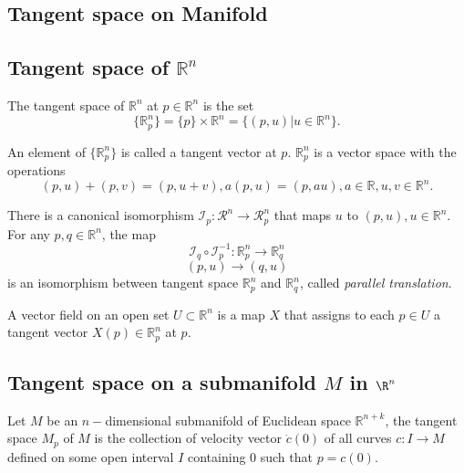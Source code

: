 \begin{refsection}
\section{Tangent space on Manifold}
\subsection{Tangent space of $\mathbb{R}^n$}
\begin{definition}
The tangent space of $\mathbb{R}^n$ at $p\in \mathbb{R}^n$ is the set
$$\{\mathbb{R}_p^n\}=\{p\}\times \mathbb{R}^n=\{(p,u)|u\in \mathbb{R}^n\}.$$	

An element of $\{\mathbb{R}_p^n\}$ is called a tangent vector at $p$. $\mathbb{R}_p^n$ is a vector space with the operations
$$(p,u)+(p,v)=(p,u+v),a(p,u)=(p,au),a\in \mathbb{R},u,v\in \mathbb{R}^n.$$
\end{definition}

\begin{definition}
There is a canonical isomorphism $\mathcal{I}_p:\mathcal{R}^n \rightarrow \mathcal{R}_p^n$ that maps $u$ to $(p,u),u\in \mathbb{R}^n$. For any $p,q\in \mathbb{R}^n$, the map
$$\mathcal{I}_q \circ \mathcal{I}_p^{-1}: \mathbb{R}_p^n \rightarrow \mathbb{R}_q^n$$
$$(p,u) \rightarrow (q,u)$$
is an isomorphism between tangent space $\mathbb{R}_p^n $ and $\mathbb{R}_q^n$, called \emph{parallel translation}.	
\end{definition}

\begin{definition}
	A vector field on an open set $U \subset \mathbb{R}^n$ is a map $X$ that assigns to each $p \in U$ a tangent vector $X(p) \in \mathbb{R}_p^n$ at $p$.
\end{definition}

\subsection{Tangent space on a submanifold $M$ in $\R^n$}
\begin{definition}\cite{walschap2015multivariable}
	Let $M$ be an $n-$dimensional submanifold of Euclidean space $\mathbb{R}^{n+k}$, the tangent space $M_p$ of $M$ is the collection of velocity vector $\dot{c}(0)$ of all curves $c: I \rightarrow M$ defined on some open interval $I$ containing 0 such that $p=c(0)$. 
\end{definition}


\end{refsection}
